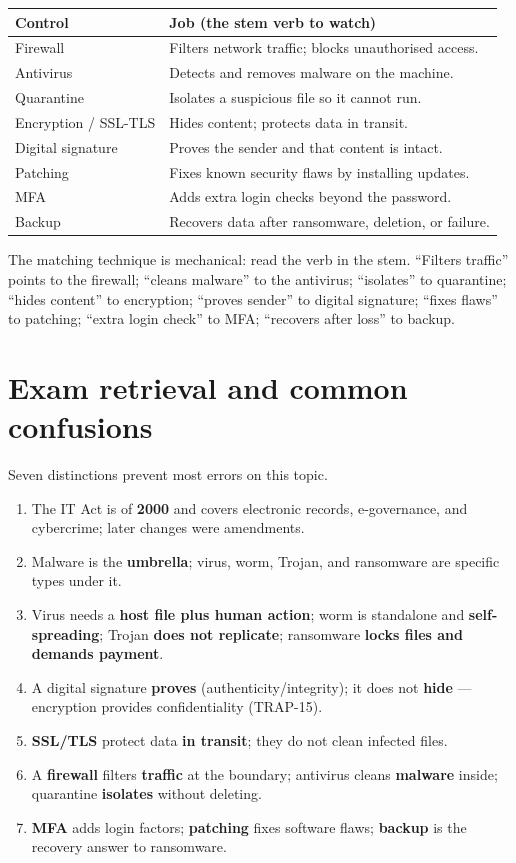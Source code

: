 \documentclass[11pt]{article}
\begin{document}
\begin{center}
\begin{tabular}{p{}p{}}
\toprule
\textbf{Control} & \textbf{Job (the stem verb to watch)} \\
\midrule
Firewall & Filters network traffic; blocks unauthorised access. \\
Antivirus & Detects and removes malware on the machine. \\
Quarantine & Isolates a suspicious file so it cannot run. \\
Encryption / SSL-TLS & Hides content; protects data in transit. \\
Digital signature & Proves the sender and that content is intact. \\
Patching & Fixes known security flaws by installing updates. \\
MFA & Adds extra login checks beyond the password. \\
Backup & Recovers data after ransomware, deletion, or failure. \\
\bottomrule
\end{tabular}
\end{center}

The matching technique is mechanical: read the verb in the stem.
``Filters traffic'' points to the firewall; ``cleans malware'' to the
antivirus; ``isolates'' to quarantine; ``hides content'' to encryption;
``proves sender'' to digital signature; ``fixes flaws'' to patching;
``extra login check'' to MFA; ``recovers after loss'' to backup.

\section{Exam retrieval and common confusions}
Seven distinctions prevent most errors on this topic.
\begin{enumerate}
  \item The IT Act is of \textbf{2000} and covers electronic records,
    e-governance, and cybercrime; later changes were amendments.
  \item Malware is the \textbf{umbrella}; virus, worm, Trojan, and
    ransomware are specific types under it.
  \item Virus needs a \textbf{host file plus human action}; worm is
    standalone and \textbf{self-spreading}; Trojan \textbf{does not
    replicate}; ransomware \textbf{locks files and demands payment}.
  \item A digital signature \textbf{proves} (authenticity/integrity); it
    does not \textbf{hide} --- encryption provides confidentiality
    (TRAP-15).
  \item \textbf{SSL/TLS} protect data \textbf{in transit}; they do not
    clean infected files.
  \item A \textbf{firewall} filters \textbf{traffic} at the boundary;
    antivirus cleans \textbf{malware} inside; quarantine
    \textbf{isolates} without deleting.
  \item \textbf{MFA} adds login factors; \textbf{patching} fixes software
    flaws; \textbf{backup} is the recovery answer to ransomware.
\end{enumerate}
\end{document}
